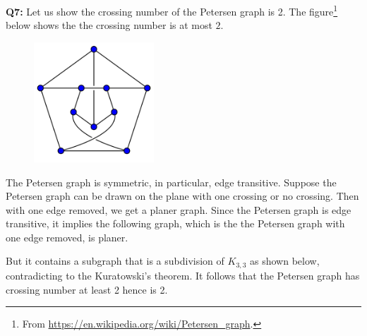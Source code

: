 \documentclass[12pt,reqno]{amsart}
\theoremstyle{definition}
\begin{document}
\newpage
\noindent \textbf{Q7:} Let us show the crossing number of the Petersen graph is 2. The figure\footnote{From \url{https://en.wikipedia.org/wiki/Petersen_graph}.} below shows the the crossing number is at most $2$.

\begin{figure}[h]
  \centering
  \includegraphics[width=4.5cm]{hw4c}
\end{figure}

The Petersen graph is symmetric, in particular, edge transitive. Suppose the Petersen graph can be drawn on the plane with one crossing or no crossing. Then with one edge removed, we get a planer graph. Since the Petersen graph is edge transitive, it implies the following graph, which is the the Petersen graph with one edge removed, is planer.

\begin{center}
\end{center}

But it contains a subgraph that is a subdivision of $K_{3,3}$ as shown below, contradicting to the Kuratowski's theorem. It follows that the Petersen graph has crossing number at least 2 hence is 2.
\end{document}
